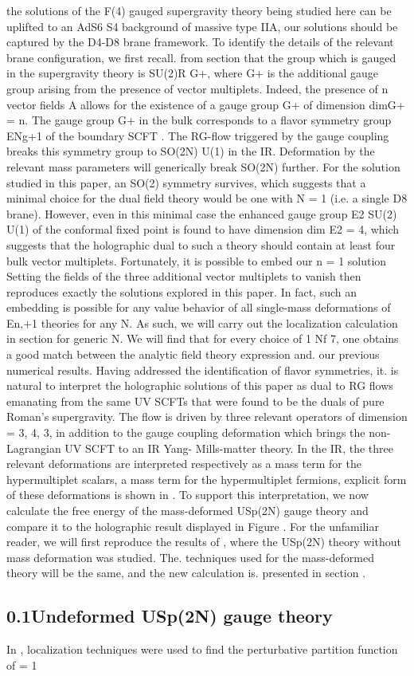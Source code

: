 \documentclass{article}
\begin{document}
\sloppy

the solutions of the F(4) gauged supergravity theory being studied here can be uplifted to
an AdS6  S4 background of massive type IIA, our solutions should be captured by the D4-D8
brane framework. To identify the details of the relevant brane configuration, we first recall.
from section that the group which is gauged in the supergravity theory is SU(2)R  G+, where
G+ is the additional gauge group arising from the presence of vector multiplets. Indeed, the
presence of n vector fields A allows for the existence of a gauge group G+ of dimension
dimG+ = n. The gauge group G+ in the bulk corresponds to a flavor symmetry group
ENg+1 of the boundary SCFT . The RG-flow triggered by the gauge coupling breaks this
symmetry group to SO(2N)  U(1) in the IR. Deformation by the relevant mass parameters
will generically break SO(2N) further. For the solution studied in this paper, an SO(2)
symmetry survives, which suggests that a minimal choice for the dual field theory would be
one with N = 1 (i.e. a single D8 brane). However, even in this minimal case the enhanced
gauge group E2  SU(2)  U(1) of the conformal fixed point is found to have dimension
dim E2 = 4, which suggests that the holographic dual to such a theory should contain at
least four bulk vector multiplets. Fortunately, it is possible to embed our n = 1 solution
Setting the fields of the three additional vector multiplets to vanish then reproduces exactly
the solutions explored in this paper. In fact, such an embedding is possible for any value
behavior of all single-mass deformations of En,+1 theories for any N. As such, we will carry
out the localization calculation in section for generic N. We will find that for every choice
of 1  Nf  7, one obtains a good match between the analytic field theory expression and.
our previous numerical results. Having addressed the identification of flavor symmetries, it.
is natural to interpret the holographic solutions of this paper as dual to RG flows emanating
from the same UV SCFTs that were found to be the duals of pure Roman's supergravity.
The flow is driven by three relevant operators of dimension  = 3, 4, 3, in addition to the
gauge coupling deformation which brings the non-Lagrangian UV SCFT to an IR Yang-
Mills-matter theory. In the IR, the three relevant deformations are interpreted respectively
as a mass term for the hypermultiplet scalars, a mass term for the hypermultiplet fermions,
explicit form of these deformations is shown in . To support this interpretation, we now
calculate the free energy of the mass-deformed USp(2N) gauge theory and compare it to the
holographic result displayed in Figure . For the unfamiliar reader, we will first reproduce
the results of , where the USp(2N) theory without mass deformation was studied. The.
techniques used for the mass-deformed theory will be the same, and the new calculation is.
presented in section .


\subsection*{0.1Undeformed USp(2N) gauge theory}


In , localization techniques were used to find the perturbative partition function of  = 1
\end{document}
